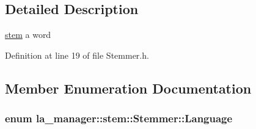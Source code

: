\begin{CompactItemize}
\subsection{Detailed Description}
\hyperlink{namespacela__manager_1_1stem}{stem} a word 

Definition at line 19 of file Stemmer.h.

\subsection{Member Enumeration Documentation}
\hypertarget{classla__manager_1_1stem_1_1Stemmer_9b35ed1ce313d309f8c7235f7052e73e}{
\subsubsection[{Language}]{\setlength{\rightskip}{0pt plus 5cm}enum {\bf la\_\-manager::stem::Stemmer::Language}}}
\label{classla__manager_1_1stem_1_1Stemmer_9b35ed1ce313d309f8c7235f7052e73e}



\end{CompactItemize}
